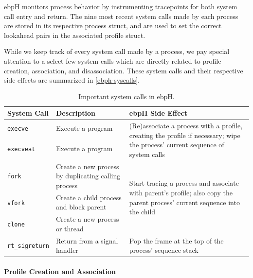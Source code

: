 \documentclass[
  12pt]{findlay}
\begin{document}
ebpH monitors process behavior by instrumenting tracepoints for both
system call entry and return. The nine most recent system calls made by
each process are stored in its respective process struct, and are used
to set the correct lookahead pairs in the associated profile struct.

While we keep track of every system call made by a process, we pay
special attention to a select few system calls which are directly
related to profile creation, association, and disassociation. These
system calls and their respective side effects are summarized in
\autoref{ebph-syscalls}.

\begin{table}
\caption{Important system calls in ebpH.}
\label{ebph-syscalls}
\begin{center}
\begin{tabular}{|l|p{2.4in}|p{2.6in}|}
\hline
\textbf{System Call} & \textbf{Description} & \textbf{ebpH Side Effect}\\
\hline
\hline
\texttt{execve} & Execute a program & \multirow{4}{2.6in}{(Re)associate a process with a profile, creating the profile if necessary;
wipe the process' current sequence of system calls}\\
&&\\
\cline{1-2}
\texttt{execveat} & Execute a program & \\
&&\\
\hline
\texttt{fork} & Create a new process by duplicating calling process & \multirow{3}{2.6in}{Start tracing a process and associate with parent's profile; also copy the parent process' current sequence into the child}\\
\cline{1-2}
\texttt{vfork} & Create a child process and block parent &\\
\cline{1-2}
\texttt{clone} & Create a new process or thread &\\
\hline
\texttt{rt\_sigreturn} & Return from a signal handler & Pop the frame at the top of the process' sequence stack\\
\hline
\end{tabular}
\end{center}
\end{table}

\hypertarget{profile-creation-and-association}{%
\paragraph{Profile Creation and
Association}\label{profile-creation-and-association}}
\end{document}

